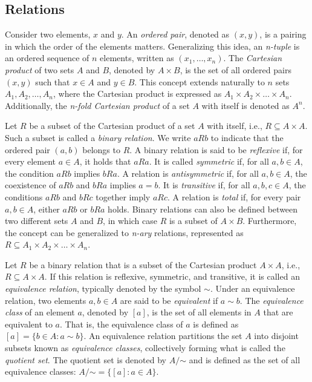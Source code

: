 
\subsection*{Relations}

Consider two elements, $x$ and $y$. An \emph{ordered pair}, denoted as $(x, y)$, is a pairing in which the order of the elements matters. Generalizing this idea, an \emph{n-tuple} is an ordered sequence of $n$ elements, written as $(x_1, \ldots, x_n)$. The \emph{Cartesian product} of two sets $A$ and $B$, denoted by $A \times B$, is the set of all ordered pairs $(x, y)$ such that $x \in A$ and $y \in B$. This concept extends naturally to $n$ sets $A_1, A_2, \dots, A_n$, where the Cartesian product is expressed as $A_1 \times A_2 \times \dots \times A_n$. Additionally, the \emph{n-fold Cartesian product} of a set $A$ with itself is denoted as $A^n$.

Let $R$ be a subset of the Cartesian product of a set $A$ with itself, i.e., $R \subseteq A \times A$. Such a subset is called a \emph{binary relation}. We write $aRb$ to indicate that the ordered pair $(a, b)$ belongs to $R$. A binary relation is said to be \emph{reflexive} if, for every element $a \in A$, it holds that $aRa$. It is called \emph{symmetric} if, for all $a, b \in A$, the condition $aRb$ implies $bRa$. A relation is \emph{antisymmetric} if, for all $a, b \in A$, the coexistence of $aRb$ and $bRa$ implies $a = b$. It is \emph{transitive} if, for all $a, b, c \in A$, the conditions $aRb$ and $bRc$ together imply $aRc$. A relation is \emph{total} if, for every pair $a, b \in A$, either $aRb$ or $bRa$ holds. Binary relations can also be defined between two different sets $A$ and $B$, in which case $R$ is a subset of $A \times B$. Furthermore, the concept can be generalized to \emph{n-ary} relations, represented as $R \subseteq A_1 \times A_2 \times \dots \times A_n$.

Let $R$ be a binary relation that is a subset of the Cartesian product $A \times A$, i.e., $R \subseteq A \times A$. If this relation is reflexive, symmetric, and transitive, it is called an \emph{equivalence relation}, typically denoted by the symbol $\sim$. Under an equivalence relation, two elements $a, b \in A$ are said to be \emph{equivalent} if $a \sim b$. The \emph{equivalence class} of an element $a$, denoted by $[a]$, is the set of all elements in $A$ that are equivalent to $a$. That is, the equivalence class of $a$ is defined as $[a] = \{ b \in A : a \sim b \}$. An equivalence relation partitions the set $A$ into disjoint subsets known as \emph{equivalence classes}, collectively forming what is called the \emph{quotient set}. The quotient set is denoted by $A / {\mathord {\sim }}$ and is defined as the set of all equivalence classes: $A / {\mathord {\sim }} = \{ [a] : a \in A \}$.

